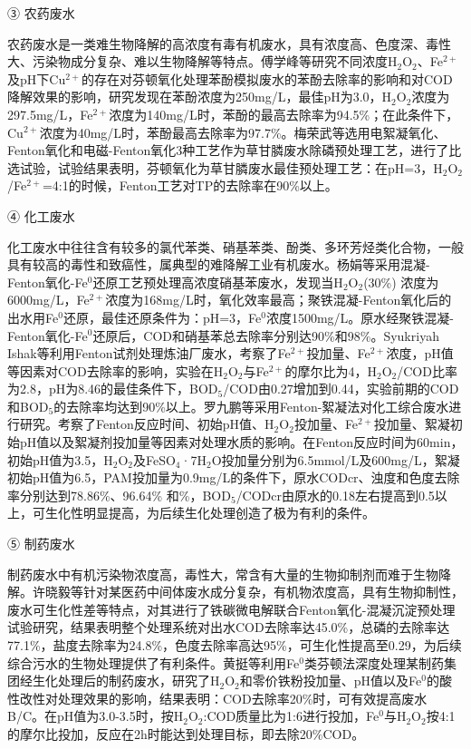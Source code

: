 ③ 农药废水

农药废水是一类难生物降解的高浓度有毒有机废水，具有浓度高、色度深、毒性大、污染物成分复杂、难以生物降解等特点。傅学峰\cite{fuxuefeng_2011}等研究不同浓度H$_2$O$_2$、Fe$^{2+}$及pH下Cu$^{2+}$的存在对芬顿氧化处理苯酚模拟废水的苯酚去除率的影响和对\linebreak COD降解效果的影响，研究发现在苯酚浓度为250mg/L，最佳pH为3.0，\linebreak H$_2$O$_2$浓度为297.5mg/L，Fe$^{2+}$浓度为140mg/L时，苯酚的最高去除率为94.5\%；在此条件下，Cu$^{2+}$浓度为40mg/L时，苯酚最高去除率为97.7\%。梅荣武\cite{meirongwu_2012}等选用电絮凝氧化、Fenton氧化和电磁-Fenton氧化3种工艺作为草甘膦废水除磷预处理工艺，进行了比选试验，试验结果表明，芬顿氧化为草甘膦废水最佳预处理工艺：在pH=3，H$_2$O$_2$/Fe$^{2+}$=4:1的时候，Fenton工艺对TP的去除率在90\%以上。

④ 化工废水

化工废水中往往含有较多的氯代苯类、硝基苯类、酚类、多环芳烃类化合物，一般具有较高的毒性和致癌性，属典型的难降解工业有机废水。杨娟\cite{yangjuan_2012}等采用混凝-Fenton氧化-Fe$^0$还原工艺预处理高浓度硝基苯废水，发现当H$_2$O$_2$(30\%) 浓度为\linebreak[0] 6000mg/L，Fe$^{2+}$浓度为168mg/L时，氧化效率最高；聚铁混凝-Fenton氧化后的出水用Fe$^0$还原，最佳还原条件为：pH=3，Fe$^0$浓度1500mg/L。原水经聚铁混凝-Fenton氧化-Fe$^0$还原后，COD和硝基苯总去除率分别达90\%和98\%。Syukriyah Ishak\cite{ishak_optimization_2013}等利用\linebreak[0] Fenton试剂处理炼油厂废水，考察了Fe$^{2+}$投加量、Fe$^{2+}$浓度，pH值等因素对COD去除率的影响，实验在H$_2$O$_2$与Fe$^{2+}$的摩尔比为4，H$_2$O$_2$/COD比率为2.8，pH为8.46的最佳条件下，BOD$_5$/COD由0.27增加到0.44，实验前期的COD和BOD$_5$的去除率均达到90\%以上。罗九鹏\cite{luojiupeng_2011}等采用Fenton-絮凝法对化工综合废水进行研究。考察了\linebreak[0] Fenton反应时间、初始pH值、H$_2$O$_2$投加量、Fe$^{2+}$投加量、絮凝初始pH值以及絮凝剂投加量等因素对处理水质的影响。在Fenton反应时间为60min，初始pH值为3.5，H$_2$O$_2$及\linebreak[0] FeSO$_4$·7H$_2$O投加量分别为6.5mmol/L及600mg/L，絮凝初始pH值为6.5，PAM投加量为0.9mg/L的条件下，原水CODcr、浊度和色度去除率分别达到78.86\%、96.64\% 和\%，BOD$_5$/CODcr由原水的0.18左右提高到0.5以上，可生化性明显提高，为后续生化处理创造了极为有利的条件。

⑤ 制药废水

制药废水中有机污染物浓度高，毒性大，常含有大量的生物抑制剂而难于生物降解。许晓毅\cite{xuxiaoyi_fenton-_2012}等针对某医药中间体废水成分复杂，有机物浓度高，具有生物抑制性，废水可生化性差等特点，对其进行了铁碳微电解联合Fenton氧化-混凝沉淀预处理试验研究，结果表明整个处理系统对出水COD去除率达45.0\%，总磷的去除率达77.1\%，盐度去除率为24.8\%，色度去除率高达95\%，可生化性提高至0.29，为后续综合污水的生物处理提供了有利条件。黄挺\cite{huangting_2017}等利用Fe$^0$类芬顿法深度处理某制药集团经生化处理后的制药废水，研究了H$_2$O$_2$和零价铁粉投加量、pH值以及Fe$^0$的酸性改性对处理效果的影响，结果表明：COD去除率20\%时，可有效提高废水B/C。在pH值为3.0-3.5时，按H$_2$O$_2$:COD质量比为1:6进行投加，Fe$^0$与H$_2$O$_2$按4:1的摩尔比投加，反应在2h时能达到处理目标，即去除20\%COD。

